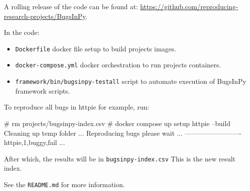 \documentclass[conference]{IEEEtran}
\begin{document}
A rolling release of the code can be found at: \url{https://github.com/reproducing-research-projects/BugsInPy}.

In the code:
\begin{itemize}
  \item \texttt{Dockerfile} docker file setup to build projects images.
  \item \texttt{docker-compose.yml} docker orchestration to run projects containers.
  \item \texttt{framework/bin/bugsinpy-testall} script to automate execution of BugsInPy framework scripts.
\end{itemize}

To reproduce all bugs in httpie for example, run: 

\begin{verbatim*}
# rm projects/bugsinpy-index.csv
# docker compose up setup httpie --build
Cleaning up temp folder ...
Reproducing bugs please wait ...
-------------------------
httpie,1,buggy,fail
...
\end{verbatim*}

After which, the results will be in \texttt{bugsinpy-index.csv} This is the new result index.

See the \texttt{README.md} for more information.
\end{document}
